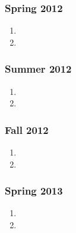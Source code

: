 \begin{frame}
\frametitle{Spring 2012}
\begin{enumerate} 
\item \tiny 
\item \tiny 
\end{enumerate} 
\end{frame}


\begin{frame}
\frametitle{Summer 2012}
\begin{enumerate} 
\item \tiny 
\item \tiny 
\end{enumerate} 
\end{frame}


\begin{frame}
\frametitle{Fall 2012}
\begin{enumerate} 
\item \tiny 
\item \tiny 
\end{enumerate} 
\end{frame}

\begin{frame}
\frametitle{Spring 2013}
\begin{enumerate} 
\item \tiny 
\item \tiny 
\end{enumerate} 
\end{frame}
